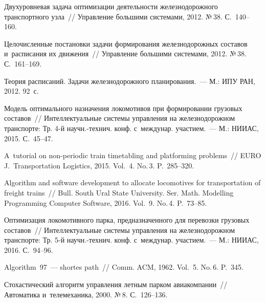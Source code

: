 \begin{multicols}{2}
{{\begin{thebibliography}{99}
Двухуровневая задача оптимизации деятельности железнодорожного транспортного узла~// 
Управление большими сис\-те\-ма\-ми, 2012. №\,38. С.~140--160.

Целочисленные постановки задачи формирования железнодорожных составов и~расписания 
их движения~// Управление большими системами, 2012. №\,38. С.~161--169.

Теория расписаний. Задачи железнодорожного планирования.~--- М.: ИПУ РАН, 2012.
92~с.

Модель оптимального назначения локомотивов при формировании грузовых составов~// 
Интеллектуальные системы управления на железнодорожном транспорте: Тр. 
4-й научн.-технич. конф. с~междунар. учас\-ти\-ем.~--- М.: НИИАС, 2015. С.~45--47.

A~tutorial on non-periodic train timetabling and platforming problems~// 
EURO J.~Transportation Logistics, 2015. Vol.~4. No.\,3. P.~285--320.

Algorithm and software development to allocate locomotives for transportation 
of freight trains~//
Bull. South Ural State University. 
Ser. Math. Modelling Programming  Computer Software, 2016. 
Vol.~9. No.\,4. P.~73--85.

Оптимизация локомотивного парка, предназначенного для перевозки грузовых составов~// 
Интеллектуальные системы управ\-ле\-ния на железнодорожном транспорте: Тр. 5-й\linebreak 
на\-учн.-тех\-нич. конф. с~междунар. участием.~--- М.: \mbox{НИИАС}, 2016. С.~94--96.
    

 Algorithm~97~--- shortes path~// Comm. ACM, 1962. 
Vol.~5. No.\,6. P.~345.

Стохастический алгоритм управления летным парком авиакомпании~// 
Автоматика и~телемеханика, 2000. №\,8. С.~126--136.

 \end{thebibliography}

 }
 }

\end{multicols}

